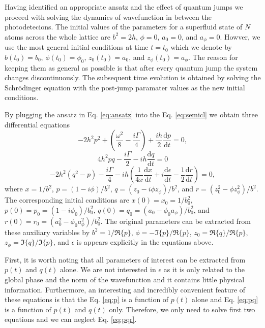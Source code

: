 Having identified an appropriate ansatz and the effect of quantum
jumps we proceed with solving the dynamics of wavefunction in between
the photodetecions. The initial values of the parameters for a
superfluid state of $N$ atoms across the whole lattice are $b^2 = 2h$,
$\phi =0$, $a_0 = 0$, and $a_\phi = 0$. Howver, we use the most
general initial conditions at time $t = t_0$ which we denote by
$b(t_0) = b_0$, $\phi(t_0) = \phi_0$, $z_0(t_0) = a_0$, and
$z_\phi(t_0) = a_\phi$. The reason for keeping them as general as
possible is that after every quantum jump the system changes
discontinuously. The subsequent time evolution is obtained by solving
the Schr\"{o}dinger equation with the post-jump paramater values as
the new initial conditions.

By plugging the ansatz in Eq. \eqref{eq:ansatz} into the
Eq. \eqref{eq:semicl} we obtain three differential equations
\begin{equation}
  \label{eq:p}
  -2 h^2 p^2 + \left( \frac{ \omega^2 } { 8 } - \frac{ i \Gamma } { 4
    } \right) + \frac{ i h } { 2 } \frac{ \mathrm{d} p } { \mathrm{d}
    t } = 0,
\end{equation}
\begin{equation}
  \label{eq:pq}
  4 h^2 p q - \frac{ i \Gamma } { 2 } - i h \frac{ \mathrm{d} q } {
    \mathrm{d} t } = 0
\end{equation}
\begin{equation}
  \label{eq:pqr}
  -2 h^2 (q^2 - p) - \frac{ i \Gamma } { 4 } - i h \left( \frac{ 1 } {
      4 x } \frac{ \mathrm{d} x } {\mathrm{d} t } + i \frac{
      \mathrm{d} \epsilon } { \mathrm{d} t } - \frac{1}{2} \frac{
      \mathrm{d} r } { \mathrm{d} t } \right) = 0,
\end{equation}
where $x = 1/b^2$, $p = (1 - i \phi)/b^2$,
$q = (z_0 - i \phi z_\phi)/b^2$, and
$r = (z_0^2 - \phi z_\phi^2)/b^2$. The corresponding initial
conditions are $x(0) = x_0 = 1/b_0^2$,
$p(0) = p_0 = (1 - i \phi_0)/b_0^2$,
$q(0) = q_0 = (a_0 - \phi_0 a_\phi)/b_0^2$, and
$r(0) = r_0 = (a_0^2 - \phi_0 a_\phi^2)/b_0^2$. The original
parameters can be extracted from these auxiliary variables by
$b^2 = 1 / \Re \{ p \}$, $\phi = - \Im \{ p \} / \Re \{ p \}$,
$z_0 = \Re \{ q \} / \Re \{ p \}$,
$z_\phi = \Im \{ q \} / \Im \{ p \}$, and $\epsilon$ is appears
explicitly in the equations above.

First, it is worth noting that all parameters of interest can be
extracted from $p(t)$ and $q(t)$ alone. We are not interested in
$\epsilon$ as it is only related to the global phase and the norm of
the wavefunction and it contains little physical
information. Furthermore, an interesting and incredibly convenient
feature of these equations is that the Eq. \eqref{eq:p} is a function
of $p(t)$ alone and Eq. \eqref{eq:pq} is a function of $p(t)$ and
$q(t)$ only. Therefore, we only need to solve first two equations and
we can neglect Eq. \eqref{eq:pqr}.

